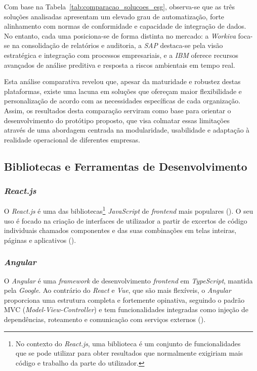 Com base na Tabela~\ref{tab:comparacao_solucoes_esg}, observa-se que as três soluções analisadas apresentam um elevado grau de automatização, forte alinhamento com normas de conformidade e capacidade de integração de dados. No entanto, cada uma posiciona-se de forma distinta no mercado: a \textit{Workiva} foca-se na consolidação de relatórios e auditoria, a \textit{SAP} destaca-se pela visão estratégica e integração com processos empresariais, e a \textit{IBM} oferece recursos avançados de análise preditiva e resposta a riscos ambientais em tempo real.

Esta análise comparativa revelou que, apesar da maturidade e robustez destas plataformas, existe uma lacuna em soluções que ofereçam maior flexibilidade e personalização de acordo com as necessidades específicas de cada organização. Assim, os resultados desta comparação serviram como base para orientar o desenvolvimento do protótipo proposto, que visa colmatar essas limitações através de uma abordagem centrada na modularidade, usabilidade e adaptação à realidade operacional de diferentes empresas.

\subsection{Bibliotecas e Ferramentas de Desenvolvimento}
\label{subsec: BFD}

\subsubsection{\textit{React.js}}

O \textit{React.js} é uma das bibliotecas\footnote{No contexto do \textit{React.js}, uma biblioteca é um conjunto de funcionalidades que se pode utilizar para obter resultados que normalmente exigiriam mais código e trabalho da parte do utilizador.} \textit{JavaScript} de \textit{frontend} mais populares (\cite{Schwarzmuller2022}). O seu uso é focado na criação de interfaces de utilizador a partir de excertos de código individuais chamados componentes e das suas combinações em telas inteiras, páginas e aplicativos (\cite{React2025}).

\subsubsection{\textit{Angular}}

O \textit{Angular} é uma \textit{framework} de desenvolvimento \textit{frontend} em \textit{TypeScript}, mantida pela \textit{Google}. Ao contrário do \textit{React} e \textit{Vue}, que são mais flexíveis, o \textit{Angular} proporciona uma estrutura completa e fortemente opinativa, seguindo o padrão MVC (\textit{Model-View-Controller}) e tem funcionalidades integradas como injeção de dependências, roteamento e comunicação com serviços externos (\cite{AngularDocs2025}).

